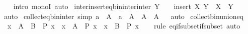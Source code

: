 \begin{isabellebody}
%
\isadelimproof
\ \ %
\endisadelimproof
%
\isatagproof
{}\isamarkupfalse%
\ {\isacharparenleft}{\kern0pt}intro\ monoI{\isacharparenright}{\kern0pt}\ auto%
\endisatagproof
{\isafoldproof}%
%
\isadelimproof
\isanewline
%
\endisadelimproof
\isanewline
{}\isamarkupfalse%
\ inter{\isacharunderscore}{\kern0pt}insert{\isacharunderscore}{\kern0pt}eq{\isacharunderscore}{\kern0pt}bin{\isacharunderscore}{\kern0pt}inter{\isacharunderscore}{\kern0pt}inter{\isacharcolon}{\kern0pt}\ {\isachardoublequoteopen}Y\ {\isasymnoteq}\ {\isacharbraceleft}{\kern0pt}{\isacharbraceright}{\kern0pt}\ {\isasymLongrightarrow}\ {\isasymInter}{\isacharparenleft}{\kern0pt}insert\ X\ Y{\isacharparenright}{\kern0pt}\ {\isacharequal}{\kern0pt}\ X\ {\isasyminter}\ {\isasymInter}Y{\isachardoublequoteclose}%
\isadelimproof
\ %
\endisadelimproof
%
\isatagproof
{}\isamarkupfalse%
\ auto%
\endisatagproof
{\isafoldproof}%
%
\isadelimproof
%
\endisadelimproof
%
\isadelimdocument
%
\endisadelimdocument
%
\isatagdocument
%
\isamarkuptrue%
%
\endisatagdocument
{\isafolddocument}%
%
\isadelimdocument
%
\endisadelimdocument
{}\isamarkupfalse%
\ collect{\isacharunderscore}{\kern0pt}eq{\isacharunderscore}{\kern0pt}bin{\isacharunderscore}{\kern0pt}inter\ {\isacharbrackleft}{\kern0pt}simp{\isacharbrackright}{\kern0pt}{\isacharcolon}{\kern0pt}\ {\isachardoublequoteopen}{\isacharbraceleft}{\kern0pt}a\ {\isasymin}\ A\ {\isacharbar}{\kern0pt}\ a\ {\isasymin}\ A{\isacharprime}{\kern0pt}{\isacharbraceright}{\kern0pt}\ {\isacharequal}{\kern0pt}\ A\ {\isasyminter}\ A{\isacharprime}{\kern0pt}{\isachardoublequoteclose}%
\isadelimproof
\ %
\endisadelimproof
%
\isatagproof
{}\isamarkupfalse%
\ auto%
\endisatagproof
{\isafoldproof}%
%
\isadelimproof
%
\endisadelimproof
\isanewline
\isanewline
{}\isamarkupfalse%
\ collect{\isacharunderscore}{\kern0pt}bin{\isacharunderscore}{\kern0pt}union{\isacharunderscore}{\kern0pt}eq{\isacharcolon}{\kern0pt}\isanewline
\ \ {\isachardoublequoteopen}{\isacharbraceleft}{\kern0pt}x\ {\isasymin}\ A\ {\isasymunion}\ B\ {\isacharbar}{\kern0pt}\ P\ x{\isacharbraceright}{\kern0pt}\ {\isacharequal}{\kern0pt}\ {\isacharbraceleft}{\kern0pt}x\ {\isasymin}\ A\ {\isacharbar}{\kern0pt}\ P\ x{\isacharbraceright}{\kern0pt}\ {\isasymunion}\ {\isacharbraceleft}{\kern0pt}x\ {\isasymin}\ B\ {\isacharbar}{\kern0pt}\ P\ x{\isacharbraceright}{\kern0pt}{\isachardoublequoteclose}\isanewline
%
\isadelimproof
\ \ %
\endisadelimproof
%
\isatagproof
{}\isamarkupfalse%
\ {\isacharparenleft}{\kern0pt}rule\ eq{\isacharunderscore}{\kern0pt}if{\isacharunderscore}{\kern0pt}subset{\isacharunderscore}{\kern0pt}if{\isacharunderscore}{\kern0pt}subset{\isacharparenright}{\kern0pt}\ auto%

\end{isabellebody}
